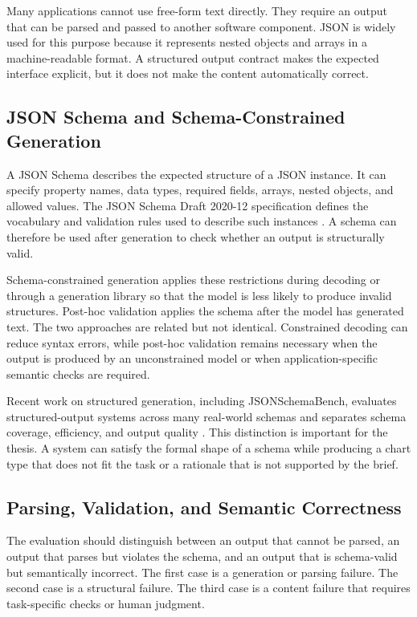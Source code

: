 Many applications cannot use free-form text directly. They require an output that can be parsed and passed to another software component. JSON is widely used for this purpose because it represents nested objects and arrays in a machine-readable format. A structured output contract makes the expected interface explicit, but it does not make the content automatically correct.

\subsection{JSON Schema and Schema-Constrained Generation}

A JSON Schema describes the expected structure of a JSON instance. It can specify property names, data types, required fields, arrays, nested objects, and allowed values. The JSON Schema Draft 2020-12 specification defines the vocabulary and validation rules used to describe such instances \cite{jsonschema2022draft}. A schema can therefore be used after generation to check whether an output is structurally valid.

Schema-constrained generation applies these restrictions during decoding or through a generation library so that the model is less likely to produce invalid structures. Post-hoc validation applies the schema after the model has generated text. The two approaches are related but not identical. Constrained decoding can reduce syntax errors, while post-hoc validation remains necessary when the output is produced by an unconstrained model or when application-specific semantic checks are required.

Recent work on structured generation, including JSONSchemaBench, evaluates structured-output systems across many real-world schemas and separates schema coverage, efficiency, and output quality \cite{geng2025structured}. This distinction is important for the thesis. A system can satisfy the formal shape of a schema while producing a chart type that does not fit the task or a rationale that is not supported by the brief.

\subsection{Parsing, Validation, and Semantic Correctness}

The evaluation should distinguish between an output that cannot be parsed, an output that parses but violates the schema, and an output that is schema-valid but semantically incorrect. The first case is a generation or parsing failure. The second case is a structural failure. The third case is a content failure that requires task-specific checks or human judgment.

